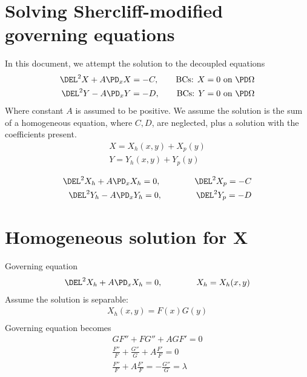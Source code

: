 \documentclass[11pt]{article}
\begin{document}
\doublespacing
\MOONSTITLE
\maketitle

\section{Solving Shercliff-modified governing equations}
In this document, we attempt the solution to the decoupled equations
\begin{equation}\begin{aligned}
\DEL^2 X + A \PD_x X = - C, \qquad \text{BCs: $X = 0 $ on $\PD \Omega$} \\
\DEL^2 Y - A \PD_x Y = - D, \qquad \text{BCs: $Y = 0 $ on $\PD \Omega$} \\
\end{aligned} \end{equation}
Where constant $A$ is assumed to be positive. We assume the solution is the sum of a homogeneous equation, where $C,D$, are neglected, plus a solution with the coefficients present.
\begin{equation}\begin{aligned}
X = X_h(x,y) + X_p(y) \\
Y = Y_h(x,y) + Y_p(y) \\
\end{aligned} \end{equation}
\begin{equation}\begin{aligned}
\DEL^2 X_h + A \PD_x X_h = 0, \qquad\qquad \DEL^2 X_p = -C \\
\DEL^2 Y_h - A \PD_x Y_h = 0, \qquad\qquad \DEL^2 Y_p = -D \\
\end{aligned} \end{equation}

\section{Homogeneous solution for X}
Governing equation
\begin{equation}\begin{aligned}
\DEL^2 X_h + A \PD_x X_h = 0, \qquad\qquad X_h = X_h(x,y) \\
\end{aligned} \end{equation}
Assume the solution is separable:
\begin{equation}\begin{aligned}
X_h(x,y) = F(x)G(y) \\
\end{aligned} \end{equation}
Governing equation becomes
\begin{equation}\begin{aligned}
G F'' + FG'' + A G F' = 0 \\
 \frac{F''}{F} + \frac{G''}{G} + A \frac{F'}{F} = 0 \\
 \frac{F''}{F} + A \frac{F'}{F} = - \frac{G''}{G} = \lambda \\
\end{aligned} \end{equation}
\end{document}
